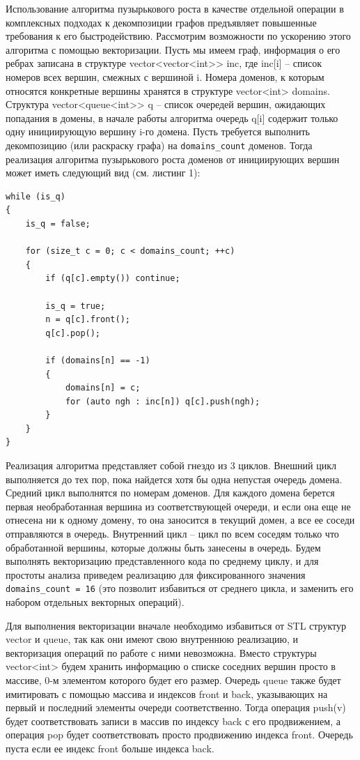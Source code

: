\documentclass[
11pt,%
tightenlines,%
twoside,%
onecolumn,%
nofloats,%
nobibnotes,%
nofootinbib,%
superscriptaddress,%
noshowpacs,%
centertags]%
{revtex4}
\begin{document}
Использование алгоритма пузырькового роста в качестве отдельной операции в комплексных подходах к декомпозиции графов предъявляет повышенные требования к его быстродействию.
Рассмотрим возможности по ускорению этого алгоритма с помощью векторизации.
Пусть мы имеем граф, информация о его ребрах записана в структуре vector<vector<int>> inc, где inc[i] -- список номеров всех вершин, смежных с вершиной i.
Номера доменов, к которым относятся конкретные вершины хранятся в структуре vector<int> domains.
Структура vector<queue<int>> q -- список очередей вершин, ожидающих попадания в домены, в начале работы алгоритма очередь q[i] содержит только одну инициирующую вершину i-го домена.
Пусть требуется выполнить декомпозицию (или раскраску графа) на \texttt{domains\_count} доменов.
Тогда реализация алгоритма пузырькового роста доменов от инициирующих вершин может иметь следующий вид (см. листинг 1):

\begin{lstlisting}[caption={Реализация алгоритма пузырькового роста доменов.},label={lst:impl}]
while (is_q)
{
    is_q = false;

    for (size_t c = 0; c < domains_count; ++c)
    {
        if (q[c].empty()) continue;

        is_q = true;
        n = q[c].front();
        q[c].pop();

        if (domains[n] == -1)
        {
            domains[n] = c;
            for (auto ngh : inc[n]) q[c].push(ngh);
        }
    }
}
\end{lstlisting}

Реализация алгоритма представляет собой гнездо из 3 циклов.
Внешний цикл выполняется до тех пор, пока найдется хотя бы одна непустая очередь домена.
Средний цикл выполнятся по номерам доменов.
Для каждого домена берется первая необработанная вершина из соответствующей очереди, и если она еще не отнесена ни к одному домену, то она заносится в текущий домен, а все ее соседи отправляются в очередь.
Внутренний цикл -- цикл по всем соседям только что обработанной вершины, которые должны быть занесены в очередь.
Будем выполнять векторизацию представленного кода по среднему циклу, и для простоты анализа приведем реализацию для фиксированного значения \texttt{domains\_count = 16} (это позволит избавиться от среднего цикла, и заменить его набором отдельных векторных операций).

Для выполнения векторизации вначале необходимо избавиться от STL структур vector и queue, так как они имеют свою внутреннюю реализацию, и векторизация операций по работе с ними невозможна.
Вместо структуры vector<int> будем хранить информацию о списке соседних вершин просто в массиве, 0-м элементом которого будет его размер.
Очередь queue также будет имитировать с помощью массива и индексов front и back, указывающих на первый и последний элементы очереди соответственно.
Тогда операция push(v) будет соответствовать записи в массив по индексу back с его продвижением, а операция pop будет соответствовать просто продвижению индекса front.
Очередь пуста если ее индекс front больше индекса back.
\end{document}
